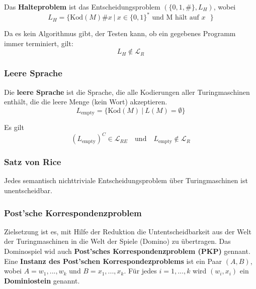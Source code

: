 \documentclass[11pt]{article}
\begin{document}
Das \textbf{Halteproblem} ist das Entscheidungsproblem $(\{0, 1, \#\}, L_H)$, wobei
\begin{equation*}
	L_H = \{\text{Kod}(M)\#x\ |\ x \in \{0,1\}^* \text{ und M h{\"a}lt auf $x$ }\}
\end{equation*}

Da es kein Algorithmus gibt, der Testen kann, ob ein gegebenes Programm immer terminiert, gilt:
\begin{equation*}
	L_H \not\in \mathcal{L}_R
\end{equation*}

\subsubsection{Leere Sprache}

Die \textbf{leere Sprache} ist die Sprache, die alle Kodierungen aller Turingmaschinen enth{\"a}lt, die die leere Menge (kein Wort) akzeptieren.
\begin{equation*}
	L_\text{empty} = \{\text{Kod}(M)\ |\ L(M) = \emptyset\}
\end{equation*}

Es gilt
\begin{equation*}
	(L_\text{empty})^C \in \mathcal{L}_{RE} \quad\text{und}\quad L_\text{empty} \not\in \mathcal{L}_{R}
\end{equation*}

\subsubsection{Satz von Rice}

Jedes semantisch nichttriviale Entscheidungsproblem {\"u}ber Turingmaschinen ist unentscheidbar. 

\subsubsection{Post'sche Korrespondenzproblem}

Zielsetzung ist es, mit Hilfe der Reduktion die Untentscheidbarkeit aus der Welt der Turingmaschinen in die Welt der Spiele (Domino) zu {\"u}bertragen. Das Dominospiel wid auch \textbf{Post'sches Korrespondenzproblem (PKP)} gennant.\\

Eine \textbf{Instanz des Post'schen Korrespondezproblems} ist ein Paar $(A,B)$, wobei $A = w_1,...,w_k$ und $B = x_1,...,x_k$. F{\"u}r jedes $i = 1,...,k$ wird $(w_i, x_i)$ ein \textbf{Dominiostein} genannt.
\end{document}
